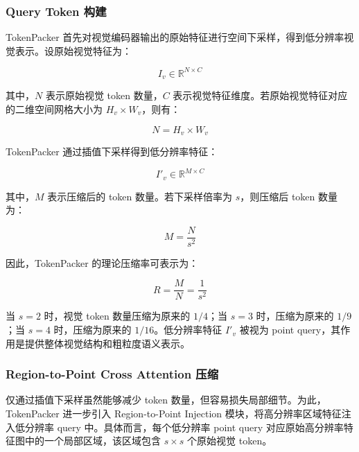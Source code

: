 \subsubsection{Query Token 构建}

TokenPacker 首先对视觉编码器输出的原始特征进行空间下采样，得到低分辨率视觉表示。设原始视觉特征为：

\begin{equation}
    \label{equ:tokenpacker_input}
    I_v\in\mathbb{R}^{N\times C}
\end{equation}

其中，$N$ 表示原始视觉 token 数量，$C$ 表示视觉特征维度。若原始视觉特征对应的二维空间网格大小为 $H_v\times W_v$，则有：

\begin{equation}
    \label{equ:tokenpacker_grid}
    N=H_v\times W_v
\end{equation}

TokenPacker 通过插值下采样得到低分辨率特征：

\begin{equation}
    \label{equ:tokenpacker_query}
    I'_v\in\mathbb{R}^{M\times C}
\end{equation}

其中，$M$ 表示压缩后的 token 数量。若下采样倍率为 $s$，则压缩后 token 数量为：

\begin{equation}
    \label{equ:tokenpacker_token_number}
    M=\frac{N}{s^2}
\end{equation}

因此，TokenPacker 的理论压缩率可表示为：

\begin{equation}
    \label{equ:tokenpacker_compression_ratio}
    R=\frac{M}{N}=\frac{1}{s^2}
\end{equation}

当 $s=2$ 时，视觉 token 数量压缩为原来的 $1/4$；当 $s=3$ 时，压缩为原来的 $1/9$；当 $s=4$ 时，压缩为原来的 $1/16$。低分辨率特征 $I'_v$ 被视为 point query，其作用是提供整体视觉结构和粗粒度语义表示。

\subsubsection{Region-to-Point Cross Attention 压缩}

仅通过插值下采样虽然能够减少 token 数量，但容易损失局部细节。为此，TokenPacker 进一步引入 Region-to-Point Injection 模块，将高分辨率区域特征注入低分辨率 query 中。具体而言，每个低分辨率 point query 对应原始高分辨率特征图中的一个局部区域，该区域包含 $s\times s$ 个原始视觉 token。

